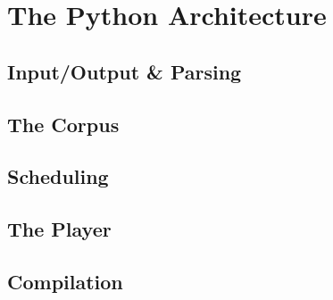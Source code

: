 \chapter{The Python Architecture}\label{sec:2-python-architecture}

\section{Input/Output \& Parsing}\label{ssec:2-io-parsing}

\section{The Corpus}\label{ssec:2-corpus}

\section{Scheduling}\label{ssec:2-scheduling}

\section{The Player}\label{ssec:2-player}

\section{Compilation}\label{ssec:2-compilation}

